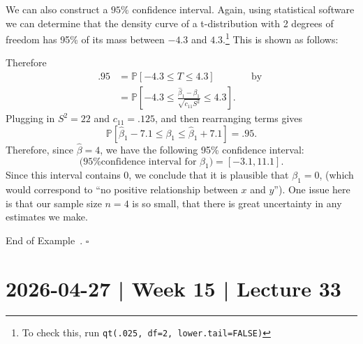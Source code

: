 \documentclass[10pt]{article}
\theoremstyle{definition}
\newtheorem{example}[theorem]{Example}
\renewenvironment{example}
{\begin{oldexample}}
  {\par\smallskip\hfill   End of Example~\theexample. $\square$    \par\end{oldexample}}
\newcommand{\1}[1]{\textbf{1}_{\left[#1\right]}} %
\def\P{\mathbb{P}} %
\begin{document}
\begin{example}
  We can also construct a $95\%$ confidence interval. Again, using statistical
  software we can determine that the density curve of a t-distribution with 2
  degrees of freedom has 95\% of its mass between $-4.3$ and
  $4.3$.\footnote{To check this, run \texttt{qt(.025, df=2,
      lower.tail=FALSE)}} This is shown as follows:
  \begin{center}
  \end{center}
  Therefore
  \begin{align*}
    .95 
    &= \P\left[-4.3 \leq T \leq 4.3\right] &&\text{by }\\
    &= \P\left[-4.3 \leq \frac{\widehat{\beta}_{1}-\beta_{1}}{\sqrt{c_{11}S^{2}}} \leq 4.3\right].
  \end{align*}
  Plugging in $S^{2}=22$ and $c_{11} = .125$, and then rearranging terms gives
  \begin{equation*}
    \P\left[\widehat{\beta}_{1}-7.1\leq \beta_{1}\leq \widehat{\beta}_{1}+7.1\right] = .95.
  \end{equation*}
  Therefore, since $\widehat{\beta}=4$, we have the following 95\% confidence
  interval:
  \begin{equation*}
    (\text{95\% confidence interval for $\beta_{1}$)} = [-3.1, 11.1].
  \end{equation*}
  Since this interval contains $0$, we conclude that it is plausible that
  $\beta_{1}=0$, (which would correspond to ``no positive relationship between
  $x$ and $y$''). One issue here is that our sample size $n=4$ is so small,
  that there is great uncertainty in any estimates we make.
\end{example}

\newpage
\section{2026-04-27 | Week 15 | Lecture 33}
\end{document}
